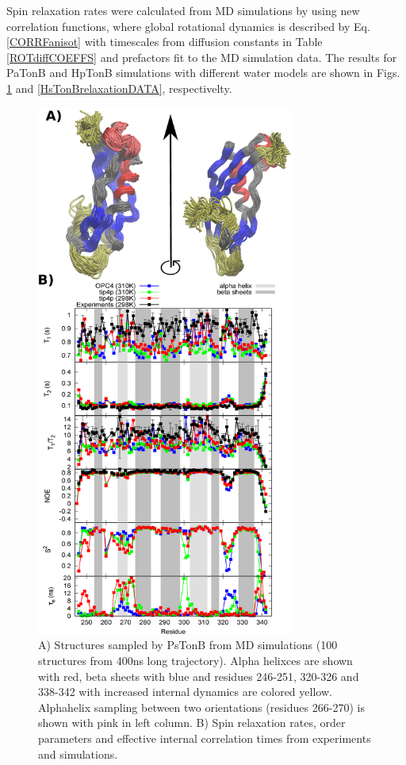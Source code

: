\documentclass[pre,aps,floatfix,authordate1-4,twocolumn]{revtex4-1}
\begin{document}
Spin relaxation rates were calculated from MD simulations by using new correlation
functions, where global rotational dynamics is described by Eq. \ref{CORRFanisot}
with timescales from diffusion constants in Table \ref{ROTdiffCOEFFS} and prefactors
fit to the MD simulation data. The results for PaTonB and HpTonB simulations with different
water models are shown in Figs. \ref{PsTonBrelaxationDATA} and \ref{HsTonBrelaxationDATA},
respectivelty. 
\begin{figure}[!h]
  \includegraphics[width=8.5cm]{../Figs/RELdataPsTonB.eps}%
  \caption{A) Structures sampled by PsTonB from MD simulations
    (100 structures from 400ns long trajectory). Alpha helixces are
    shown with red, beta sheets with blue and residues 246-251, 320-326 and 338-342
    with increased internal dynamics are colored yellow.
    Alphahelix sampling between two orientations (residues 266-270) is shown with pink in left column.
    B) Spin relaxation rates, order parameters and effective internal correlation
    times from experiments and simulations.\label{PsTonBrelaxationDATA}}%
\end{figure}
\end{document}
